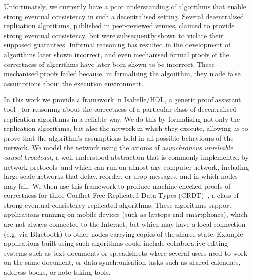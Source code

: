 \documentclass[acmlarge,review,anonymous]{acmart}\settopmatter{printfolios=true}
\begin{document}
Unfortunately, we currently have a poor understanding of algorithms that enable strong eventual consistency in such a decentralised setting.
Several decentralised replication algorithms, published in peer-reviewed venues, claimed to provide strong eventual consistency, but were subsequently shown to violate their supposed guarantees.
Informal reasoning has resulted in the development of algorithms later shown incorrect, and even mechanised formal proofs of the correctness of algorithms have later been shown to be incorrect.
These mechanised proofs failed because, in formalising the algorithm, they made false assumptions about the execution environment.

In this work we provide a framework in Isabelle/HOL, a generic proof assistant tool \cite{DBLP:conf/tphol/WenzelPN08}, for reasoning about the correctness of a particular class of decentralised replication algorithms in a reliable way.
We do this by formalising not only the replication algorithms, but also the network in which they execute, allowing us to prove that the algorithm's assumptions hold in all possible behaviours of the network.
We model the network using the axioms of \emph{asynchronous unreliable causal broadcast}, a well-understood abstraction that is commonly implemented by network protocols, and which can run on almost any computer network, including large-scale networks that delay, reorder, or drop messages, and in which nodes may fail.
We then use this framework to produce machine-checked proofs of correctness for three Conflict-Free Replicated Data Types (CRDT)~\citet{Shapiro:2011wy,Shapiro:2011un}, a class of strong eventual consistency replicated algorithms.
These algorithms support applications running on mobile devices (such as laptops and smartphones), which are not always connected to the Internet, but which may have a local connection (e.g. via Bluetooth) to other nodes carrying copies of the shared state.
Example applications built using such algorithms could include collaborative editing systems such as text documents or spreadsheets where several users need to work on the same document, or data synchronisation tasks such as shared calendars, address books, or note-taking tools.
\end{document}
